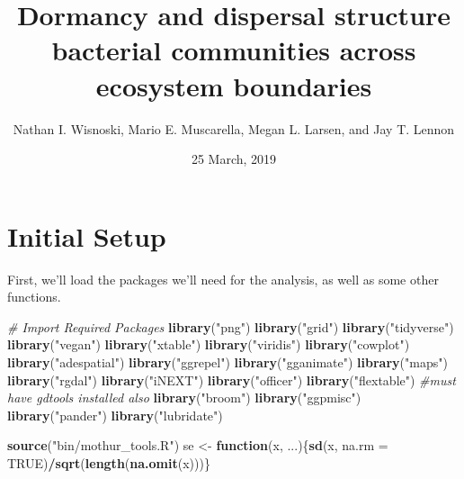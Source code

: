 \documentclass[]{article}
\title{Dormancy and dispersal structure bacterial communities across ecosystem
boundaries}
\author{Nathan I. Wisnoski, Mario E. Muscarella, Megan L. Larsen, and Jay T.
Lennon}
\date{25 March, 2019}
\newenvironment{Shaded}{\begin{snugshade}}{\end{snugshade}}
\newcommand{\KeywordTok}[1]{\textcolor[rgb]{0.13,0.29,0.53}{\textbf{#1}}}
\newcommand{\DataTypeTok}[1]{\textcolor[rgb]{0.13,0.29,0.53}{#1}}
\newcommand{\StringTok}[1]{\textcolor[rgb]{0.31,0.60,0.02}{#1}}
\newcommand{\CommentTok}[1]{\textcolor[rgb]{0.56,0.35,0.01}{\textit{#1}}}
\newcommand{\OtherTok}[1]{\textcolor[rgb]{0.56,0.35,0.01}{#1}}
\newcommand{\ControlFlowTok}[1]{\textcolor[rgb]{0.13,0.29,0.53}{\textbf{#1}}}
\newcommand{\OperatorTok}[1]{\textcolor[rgb]{0.81,0.36,0.00}{\textbf{#1}}}
\newcommand{\NormalTok}[1]{#1}
\begin{document}
\maketitle

\section{Initial Setup}\label{initial-setup}

First, we'll load the packages we'll need for the analysis, as well as
some other functions.

\begin{Shaded}
\begin{Highlighting}[]
\CommentTok{# Import Required Packages}
\KeywordTok{library}\NormalTok{(}\StringTok{"png"}\NormalTok{)}
\KeywordTok{library}\NormalTok{(}\StringTok{"grid"}\NormalTok{)}
\KeywordTok{library}\NormalTok{(}\StringTok{"tidyverse"}\NormalTok{)   }
\KeywordTok{library}\NormalTok{(}\StringTok{"vegan"}\NormalTok{)}
\KeywordTok{library}\NormalTok{(}\StringTok{"xtable"}\NormalTok{)}
\KeywordTok{library}\NormalTok{(}\StringTok{"viridis"}\NormalTok{)}
\KeywordTok{library}\NormalTok{(}\StringTok{"cowplot"}\NormalTok{)}
\KeywordTok{library}\NormalTok{(}\StringTok{"adespatial"}\NormalTok{)}
\KeywordTok{library}\NormalTok{(}\StringTok{"ggrepel"}\NormalTok{)}
\KeywordTok{library}\NormalTok{(}\StringTok{"gganimate"}\NormalTok{)}
\KeywordTok{library}\NormalTok{(}\StringTok{"maps"}\NormalTok{)}
\KeywordTok{library}\NormalTok{(}\StringTok{"rgdal"}\NormalTok{)}
\KeywordTok{library}\NormalTok{(}\StringTok{"iNEXT"}\NormalTok{)}
\KeywordTok{library}\NormalTok{(}\StringTok{"officer"}\NormalTok{)}
\KeywordTok{library}\NormalTok{(}\StringTok{"flextable"}\NormalTok{) }\CommentTok{#must have gdtools installed also}
\KeywordTok{library}\NormalTok{(}\StringTok{"broom"}\NormalTok{)}
\KeywordTok{library}\NormalTok{(}\StringTok{"ggpmisc"}\NormalTok{)}
\KeywordTok{library}\NormalTok{(}\StringTok{"pander"}\NormalTok{)}
\KeywordTok{library}\NormalTok{(}\StringTok{"lubridate"}\NormalTok{)}

\KeywordTok{source}\NormalTok{(}\StringTok{"bin/mothur_tools.R"}\NormalTok{)}
\NormalTok{se <-}\StringTok{ }\ControlFlowTok{function}\NormalTok{(x, ...)\{}\KeywordTok{sd}\NormalTok{(x, }\DataTypeTok{na.rm =} \OtherTok{TRUE}\NormalTok{)}\OperatorTok{/}\KeywordTok{sqrt}\NormalTok{(}\KeywordTok{length}\NormalTok{(}\KeywordTok{na.omit}\NormalTok{(x)))\}}
\end{Highlighting}
\end{Shaded}
\end{document}
